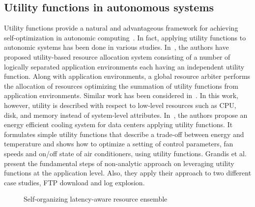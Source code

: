 \subsection{Utility functions in autonomous systems}
\label{solare:utility}
Utility functions provide a natural and advantageous framework for
achieving self-optimization in autonomic computing~\cite{utilityself}.
%
In fact, applying utility functions to autonomic systems has been done
in various studies.
%
In~\cite{william, unity}, the authors have proposed utility-based resource allocation system
consisting of a number of logically separated application environments
each having an independent utility function.
%
Along with application environments, a global resource arbiter performs
the allocation of resources optimizing the summation of utility
functions from application environments.
%
Similar work has been considered in~\cite{directed}.
%
In this work, however, utility is described with respect to low-level
resources such as CPU, disk, and memory instead of system-level
attributes.
%
In~\cite{cooling}, the authors propose an energy efficient cooling system for data
centers applying utility functions.
%
It formulates simple utility functions that describe a trade-off between
energy and temperature and shows how to optimize a setting of control
parameters, fan speeds and on/off state of air conditioners, using
utility functions.
%
Grandis et al.~\cite{grandis} present the fundamental steps of non-analytic approach on
leveraging utility functions at the application level.
%
Also, they apply their approach to two different case studies, FTP
download and log explosion.
%

\begin{figure}
\centering
{}
\caption{Self-organizing latency-aware resource ensemble}
\label{fig:solare}
\end{figure}
%

